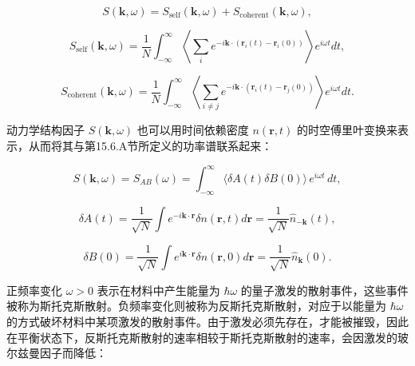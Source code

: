 \begin{equation}\tag{15.6.19}\label{eq:15.6.19}
S ( \pmb { k } , \omega ) = S _ { \mathrm { s e l f } } ( \pmb { k } , \omega ) + S _ { \mathrm { c o h e r e n t } } ( \pmb { k } , \omega ) ,
\end{equation}

\begin{equation}\tag{15.6.20}\label{eq:15.6.20}
S _ { \mathrm { s e l f } } ( \pmb { k } , \omega ) = \frac { 1 } { N } \int _ { - \infty } ^{\infty} \left\langle \sum _ { i } e ^{- i \pmb { k} \cdot ( \pmb { r } _ { i } ( t ) - \pmb { r } _ { i } ( 0 ) ) } \right\rangle e ^{i \omega t} d t ,
\end{equation}

\begin{equation}\tag{15.6.21}\label{eq:15.6.21}
S _ { \mathrm { c o h e r e n t } } ( \pmb { k } , \omega ) = \frac { 1 } { N } \int _ { - \infty } ^{\infty} \left\langle \sum _ { i \neq j } e ^{- i \pmb { k} \cdot ( \pmb { r } _ { i } ( t ) - \pmb { r } _ { j } ( 0 ) ) } \right\rangle e ^{i \omega t} d t .
\end{equation}

动力学结构因子 \(S(\boldsymbol{k},\omega)\) 也可以用时间依赖密度 \(n(\boldsymbol{r},t)\) 的时空傅里叶变换来表示，从而将其与第15.6.A节所定义的功率谱联系起来：

\begin{equation}\tag{15.6.22}\label{eq:15.6.22}
S ( \pmb { k } , \omega ) = S _ { A B } ( \omega ) = \int _ { - \infty } ^{\infty} \langle \delta A ( t ) \delta B ( 0 ) \rangle \, e ^{i \omega t} \, d t ,
\end{equation}

\begin{equation}\tag{15.6.23}\label{eq:15.6.23}
\delta A ( t ) = \frac { 1 } { \sqrt { N } } \int e ^{- i \mathbf { k} \cdot \mathbf { r } } \delta n ( \mathbf { r } , t ) d \mathbf { r } = \frac { 1 } { \sqrt { N } } \hat { n } _ { - \mathbf { k } } ( t ) ,
\end{equation}

\begin{equation}\tag{15.6.24}\label{eq:15.6.24}
\delta B ( 0 ) = \frac { 1 } { \sqrt { N } } \int e ^{i \mathbf { k} \cdot \mathbf { r } } \delta n ( \mathbf { r } , 0 ) d \mathbf { r } = \frac { 1 } { \sqrt { N } } \hat { n } _ { \mathbf { k } } ( 0 ) .
\end{equation}

正频率变化 \(\omega > 0\) 表示在材料中产生能量为 \(\hbar\omega\) 的量子激发的散射事件，这些事件被称为斯托克斯散射。负频率变化则被称为反斯托克斯散射，对应于以能量为 \(\hbar\omega\) 的方式破坏材料中某项激发的散射事件。由于激发必须先存在，才能被摧毁，因此在平衡状态下，反斯托克斯散射的速率相较于斯托克斯散射的速率，会因激发的玻尔兹曼因子而降低：

